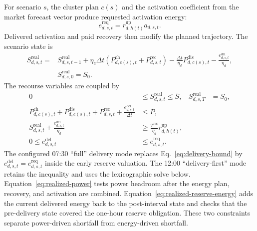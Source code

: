 \documentclass[11pt,a4paper]{article}
\begin{document}
For scenario $s$, the cluster plan $c(s)$ and the activation coefficient from
the market forecast vector produce requested activation energy:
\begin{equation}
  e^{\mathrm{req}}_{d,s,t}
  =r^{\mathrm{up}}_{d,h(t)}a_{d,s,t}.
  \label{eq:required-activation}
\end{equation}
Delivered activation and paid recovery then modify the planned trajectory.  The
scenario state is
\begin{align}
  S^{\mathrm{real}}_{d,s,t}
  ={}&S^{\mathrm{real}}_{d,s,t-1}
    +\eta_c\Delta t\left(P^{\mathrm{ch}}_{d,c(s),t}
      +P^{\mathrm{rec}}_{d,s,t}\right)
    -\frac{\Delta t}{\eta_d}P^{\mathrm{dis}}_{d,c(s),t}
    -\frac{e^{\mathrm{del}}_{d,s,t}}{\eta_d},
  \nonumber\\
  &S^{\mathrm{real}}_{d,s,0}=S_0.
  \label{eq:realized-soc}
\end{align}
The recourse variables are coupled by
\begin{align}
  0&\leq S^{\mathrm{real}}_{d,s,t}\leq\bar S,
  &S^{\mathrm{real}}_{d,s,T}&=S_0,
  \label{eq:realized-soc-band}\\
  P^{\mathrm{ch}}_{d,c(s),t}+P^{\mathrm{dis}}_{d,c(s),t}
  +P^{\mathrm{rec}}_{d,s,t}
  +\frac{e^{\mathrm{del}}_{d,s,t}}{\Delta t}
  &\leq\bar P,
  \label{eq:realized-power}\\
  S^{\mathrm{real}}_{d,s,t}
  +\frac{e^{\mathrm{del}}_{d,s,t}}{\eta_d}
  &\geq\frac{T^{\mathrm{res}}}{\eta_d}
  r^{\mathrm{up}}_{d,h(t)},
  \label{eq:realized-reserve-energy}\\
  0\leq e^{\mathrm{del}}_{d,s,t}
  &\leq e^{\mathrm{req}}_{d,s,t}.
  \label{eq:delivery-bound}
\end{align}
The configured 07:30 ``full'' delivery mode replaces
Eq.~\eqref{eq:delivery-bound} by
$e^{\mathrm{del}}_{d,s,t}=e^{\mathrm{req}}_{d,s,t}$ inside the early reserve
valuation.  The 12:00 ``delivery-first'' mode retains the inequality and uses
the lexicographic solve below.
Equation~\eqref{eq:realized-power} tests power headroom after the energy plan,
recovery, and activation are combined.  Equation~\eqref{eq:realized-reserve-energy}
adds the current delivered energy back to the post-interval state and checks
that the pre-delivery state covered the one-hour reserve obligation.  These two
constraints separate power-driven shortfall from energy-driven shortfall.
\end{document}
